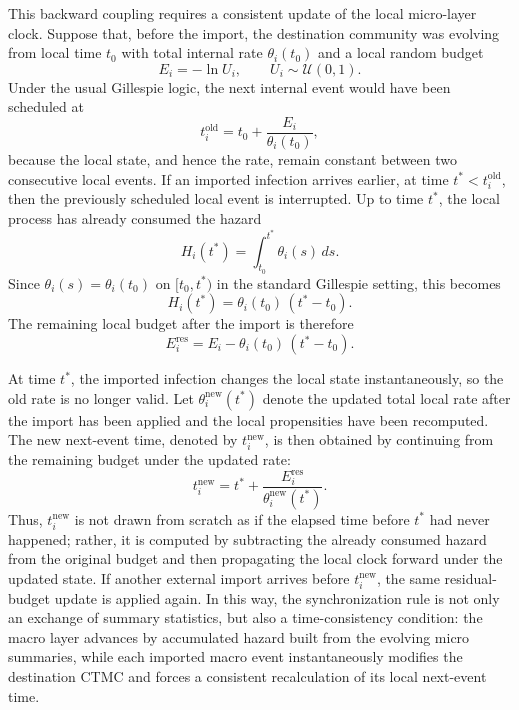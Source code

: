 \documentclass{article}
\begin{document}
This backward coupling requires a consistent update of the local micro-layer clock. Suppose that, before the import, the destination community was evolving from local time \(t_0\) with total internal rate \(\theta_i(t_0)\) and a local random budget
\[
E_i=-\ln U_i, \qquad U_i\sim \mathcal U(0,1).
\]
Under the usual Gillespie logic, the next internal event would have been scheduled at
\[
t_i^{\mathrm{old}}=t_0+\frac{E_i}{\theta_i(t_0)},
\]
because the local state, and hence the rate, remain constant between two consecutive local events. If an imported infection arrives earlier, at time \(t^\ast<t_i^{\mathrm{old}}\), then the previously scheduled local event is interrupted. Up to time \(t^\ast\), the local process has already consumed the hazard
\[
H_i(t^\ast)=\int_{t_0}^{t^\ast}\theta_i(s)\,ds.
\]
Since \(\theta_i(s)=\theta_i(t_0)\) on \([t_0,t^\ast)\) in the standard Gillespie setting, this becomes
\[
H_i(t^\ast)=\theta_i(t_0)\,(t^\ast-t_0).
\]
The remaining local budget after the import is therefore
\[
E_i^{\mathrm{res}}=E_i-\theta_i(t_0)\,(t^\ast-t_0).
\]

At time \(t^\ast\), the imported infection changes the local state instantaneously, so the old rate is no longer valid. Let \(\theta_i^{\mathrm{new}}(t^\ast)\) denote the updated total local rate after the import has been applied and the local propensities have been recomputed. The new next-event time, denoted by \(t_i^{\mathrm{new}}\), is then obtained by continuing from the remaining budget under the updated rate:
\[
t_i^{\mathrm{new}}=t^\ast+\frac{E_i^{\mathrm{res}}}{\theta_i^{\mathrm{new}}(t^\ast)}.
\]
Thus, \(t_i^{\mathrm{new}}\) is not drawn from scratch as if the elapsed time before \(t^\ast\) had never happened; rather, it is computed by subtracting the already consumed hazard from the original budget and then propagating the local clock forward under the updated state. If another external import arrives before \(t_i^{\mathrm{new}}\), the same residual-budget update is applied again. In this way, the synchronization rule is not only an exchange of summary statistics, but also a time-consistency condition: the macro layer advances by accumulated hazard built from the evolving micro summaries, while each imported macro event instantaneously modifies the destination CTMC and forces a consistent recalculation of its local next-event time.
\end{document}
